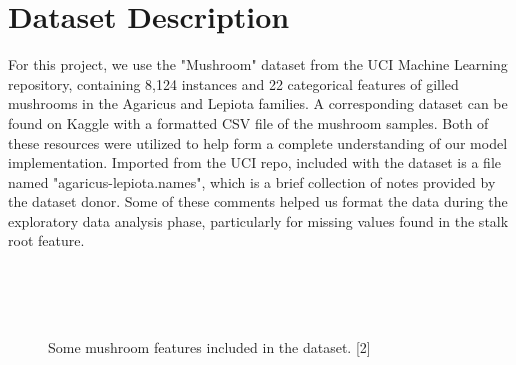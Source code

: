 \documentclass[11pt, conference]{IEEEtran}
\begin{document}
\section{Dataset Description}
    For this project, we use the "Mushroom" dataset from the UCI Machine Learning repository, containing 8,124 instances and 22 categorical features of gilled mushrooms in the Agaricus and Lepiota families. A corresponding dataset can be found on Kaggle with a formatted CSV file of the mushroom samples. Both of these resources were utilized to help form a complete understanding of our model implementation. Imported from the UCI repo, included with the dataset is a file named "agaricus-lepiota.names", which is a brief collection of notes provided by the dataset donor. Some of these comments helped us format the data during the exploratory data analysis phase, particularly for missing values found in the stalk root feature.

    \begin{figure}[ht!]
        \centering
         \\
         \\
         \\
        \caption{Some mushroom features included in the dataset. [2]}
        \label{fig:graphic1}
    \end{figure}
\end{document}
